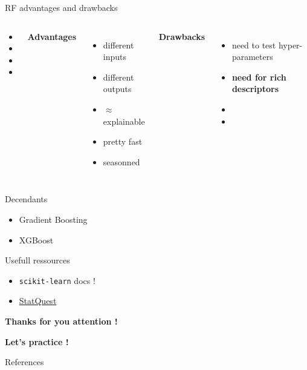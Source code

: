 \documentclass{irdbeamer}
\begin{document}
\begin{frame}{RF advantages and drawbacks}
\begin{columns}
\begin{column}{0.05\textwidth}
\begin{itemize}
    \item[] 
    \item[] 
    \item[] 
    \item[] 
\end{itemize}
\end{column}
        \textbf{Advantages}
        \begin{itemize}
            \item<1-> different inputs
            \item<2-> different outputs
            \item<3-> $\approx$ explainable
            \item<4-> pretty fast
            \item<5-> seasonned
        \end{itemize}
        \textbf{Drawbacks}
        \begin{itemize}
            \item<6-> need to test hyper-parameters
            \item<7-> \textbf{need for rich descriptors}
            \item[] 
            \item[] 
        \end{itemize}
\end{columns}
\end{frame}

\begin{frame}{Decendants}
    \begin{itemize}
        \item Gradient Boosting
        \item XGBoost
    \end{itemize}
\end{frame}

\begin{frame}{Usefull ressources}
\begin{itemize}
    \item \texttt{scikit-learn} docs !
    \item \href{https://www.youtube.com/@statquest}{StatQuest}
\end{itemize}
\end{frame}

\begin{frame}[plain]
    \Huge{\textbf{Thanks for you attention !}}
    
    \vfill
    
    \LARGE{\textbf{Let's practice !}}
\end{frame}

\appendix
\begin{frame}[allowframebreaks]{References}
    {\footnotesize \printbibliography[heading=none]}
\end{frame}
\end{document}
